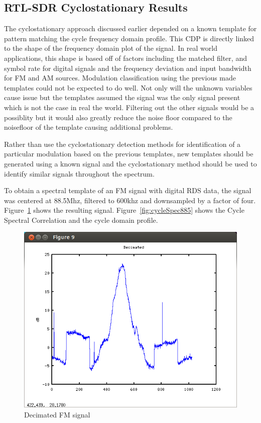 \subsection*{RTL-SDR Cyclostationary Results}

The cyclostationary approach discussed earlier depended
on a known template for pattern matching the cycle frequency domain profile. 
This CDP is directly linked to the shape of the frequency domain plot of the
signal.  In real world applications, this shape is based off of factors
including the matched filter, and symbol rate for digital signals and the
frequency deviation and input bandwidth for FM and AM sources.
Modulation classification using the previous made templates could not be
expected to do well.  Not only will the unknown variables cause issue but the templates
assumed the signal was the only signal present which is not the case in real the
world.  Filtering out the other signals would be a possiblity but it would also
greatly reduce the noise floor compared to the noisefloor of the template
causing additional problems.

Rather than use the cyclostationary detection methods for identification of a
particular modulation based on the previous templates, new templates should be
generated using a known signal and the cyclostationary method should be used to
identify similar signals throughout the spectrum.  

To obtain a spectral template of an FM signal with digital RDS data, the signal
was centered at 88.5Mhz, filtered to 600khz and downsampled by a factor of four.
Figure~\ref{fig:decimatedFMandDig} shows the resulting signal. 
Figure~\ref{fig:cycleSpec885} shows the Cycle Spectral Correlation and the cycle
domain profile.

\begin{figure}
\centering
\includegraphics[width=\linewidth]{../img/Report_Decimated_FM_and_Digital.png}
\caption{Decimated FM signal}
\label{fig:decimatedFMandDig}

\end{figure}

